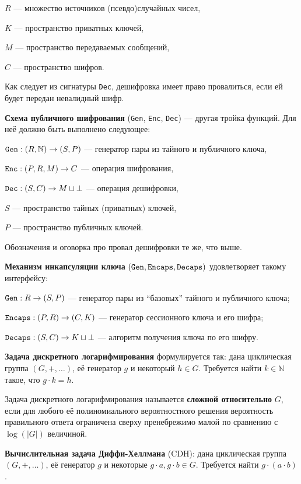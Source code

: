 \documentclass[a4paper,14pt]{extarticle}
\newcommand{\deff}{\vspace{0.2cm} \noindent}
\begin{document}
$R$ --- множество источников (псевдо)случайных чисел,

$K$ --- пространство приватных ключей,

$M$ --- пространство передаваемых сообщений,

$C$ --- пространство шифров.

\noindent Как следует из сигнатуры \verb|Dec|, дешифровка имеет право
провалиться, если ей будет передан невалидный шифр.

\deff \textbf{Схема публичного шифрования} (\verb|Gen|, \verb|Enc|, \verb|Dec|)
--- другая тройка функций. Для неё должно быть выполнено следующее:

$\verb|Gen|: (R, \mathbb{N}) \to (S, P)$ --- генератор пары из тайного и
публичного ключа,

$\verb|Enc|: (P, R, M) \to C$ --- операция шифрования,

$\verb|Dec|: (S, C) \to M \sqcup \bot$ --- операция дешифровки,

$S$ --- пространство тайных (приватных) ключей,

$P$ --- пространство публичных ключей.

\noindent Обозначения и оговорка про провал дешифровки те же, что выше.

\deff \textbf{Механизм инкапсуляции ключа}
$(\verb|Gen|, \verb|Encaps|, \verb|Decaps|)$ удовлетворяет такому интерфейсу:

$\verb|Gen|: R \to (S, P)$ --- генератор пары из ``базовых'' тайного и
публичного ключа;

$\verb|Encaps|: (P, R) \to (C, K)$ --- генератор сессионного ключа и
его шифра;

$\verb|Decaps|: (S, C) \to K \sqcup \bot$ --- алгоритм получения ключа по его
шифру.

\deff \textbf{Задача дискретного логарифмирования} формулируется так: дана
циклическая группа $(G, +, \dots)$, её генератор $g$ и некоторый
$h \in G$. Требуется найти $k \in \mathbb{N}$ такое, что
$g \cdot k = h$.

Задача дискретного логарифмирования называется
\textbf{сложной относительно} $G$, если для любого её полиномиального
вероятностного решения вероятность правильного ответа ограничена сверху
пренебрежимо малой по сравнению с $\log(|G|)$ величиной.

\deff \textbf{Вычислительная задача Диффи-Хеллмана} (CDH): дана циклическая
группа $(G, +, \dots)$, её генератор $g$ и некоторые
$g \cdot a, g \cdot b \in G$. Требуется найти $g \cdot (a \cdot b)$.
\end{document}

